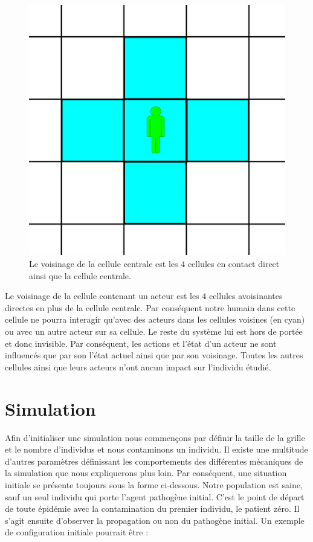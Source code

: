\begin{figure}[h]
	\centering
	\captionsetup{justification=centering}
	\includegraphics[scale=0.5]{Images/voisinage.png}
	\caption[Voisinage d'une cellule]{Le voisinage de la cellule centrale est les $4$ cellules en contact direct ainsi que la cellule centrale.}
\end{figure}

Le voisinage de la cellule contenant un acteur est les $4$ cellules avoisinantes directes en plus de la cellule centrale. Par conséquent notre humain dans cette cellule ne pourra interagir qu'avec des acteurs dans les cellules voisines (en cyan) ou avec un autre acteur sur sa cellule. Le reste du système lui est hors de portée et donc invisible. Par conséquent, les actions et l'état d'un acteur ne sont influencés que par son l'état actuel ainsi que par son voisinage. Toutes les autres cellules ainsi que leurs acteurs n'ont aucun impact sur l'individu étudié.

\section{Simulation}

Afin d'initialiser une simulation nous commençons par définir la taille de la grille et le nombre d'individus et nous contaminons un individu. Il existe une multitude d'autres paramètres définissant les comportements des différentes mécaniques de la simulation que nous expliquerons plus loin. Par conséquent, une situation initiale se présente toujours sous la forme ci-dessous. Notre population est saine, sauf un seul individu qui porte l'agent pathogène initial. C'est le point de départ de toute épidémie avec la contamination du premier individu, le patient zéro. Il s'agit ensuite d'observer la propagation ou non du pathogène initial. Un exemple de configuration initiale pourrait être : \\

